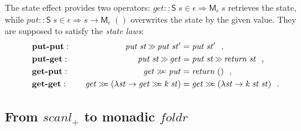 \documentclass{llncs}
\newcommand{\Conid}[1]{\mathit{#1}}
\newcommand{\Varid}[1]{\mathit{#1}}
\let\Varid\mathit
\let\Conid\mathsf
\begin{document}
The state effect provides two operators: \ensuremath{\Varid{get}\mathbin{::}\Conid{S}\;\Varid{s}\in\epsilon\Rightarrow \Conid{M}_{\epsilon}\;\Varid{s}} retrieves the state, while \ensuremath{\Varid{put}\mathbin{::}\Conid{S}\;\Varid{s}\in\epsilon\Rightarrow \Varid{s}\to \Conid{M}_{\epsilon}\;()} overwrites the state by the given value. They are supposed to satisfy the \emph{state laws}:
\begin{alignat}{2}
&\mbox{\bf put-put}:\quad &
\ensuremath{\Varid{put}\;\Varid{st}\mathbin{\hstretch{0.7}{>\!\!>}}\Varid{put}\;\Varid{st'}} &= \ensuremath{\Varid{put}\;\Varid{st'}}~~\mbox{,} \label{eq:put-put}\\
&\mbox{\bf put-get}:~ &
\ensuremath{\Varid{put}\;\Varid{st}\mathbin{\hstretch{0.7}{>\!\!>}}\Varid{get}} &= \ensuremath{\Varid{put}\;\Varid{st}\mathbin{\hstretch{0.7}{>\!\!>}}\Varid{return}\;\Varid{st}} ~~\mbox{,} \label{eq:get-put}\\
&\mbox{\bf get-put}:~ &
\ensuremath{\Varid{get}\mathrel{\hstretch{0.7}{>\!\!>\!\!=}}\Varid{put}} &= \ensuremath{\Varid{return}\;()} ~~\mbox{,} \label{eq:put-get}\\
&\mbox{\bf get-get}:\quad &
\ensuremath{\Varid{get}\mathrel{\hstretch{0.7}{>\!\!>\!\!=}}(\lambda \Varid{st}\to \Varid{get}\mathrel{\hstretch{0.7}{>\!\!>\!\!=}}\Varid{k}\;\Varid{st})} &= \ensuremath{\Varid{get}\mathrel{\hstretch{0.7}{>\!\!>\!\!=}}(\lambda \Varid{st}\to \Varid{k}\;\Varid{st}\;\Varid{st})}
~~\mbox{.} \label{eq:get-get}
\end{alignat}

\subsection{From \ensuremath{\Varid{scanl}_{+}} to monadic \ensuremath{\Varid{foldr}}}
\label{sec:scanl-scanlM}
\end{document}
